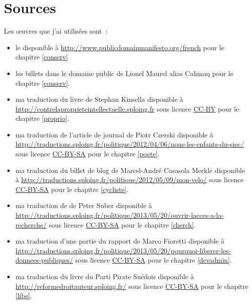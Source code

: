 \chapter*{Sources}

Les œuvres que j'ai utilisées sont~:

\begin{itemize}
\item le  disponible à \url{http://www.publicdomainmanifesto.org/french} pour le chapitre \ref{conserv}
\item les billets  dans le domaine public de Lionel Maurel alias Calimaq pour le chapitre \ref{conserv}.
\item ma traduction du livre  de Stephan Kinsella disponible à \url{http://contrelaproprieteintellectuelle.sploing.fr} sous licence \href{http://creativecommons.org/licenses/by/2.0/fr/}{CC-BY}  pour le chapitre \ref{proprio}.
\item ma traduction de l'article de journal  de Piotr Czerski disponible à \url{http://traductions.sploing.fr/politique/2012/04/06/nous-les-enfants-du-siec/} sous licence \href{http://creativecommons.org/licenses/by-sa/2.0/fr/}{CC-BY-SA} pour le chapitre \ref{poete}.
\item ma traduction du billet de blog  de Marcel-André Casasola Merkle disponible à \url{http://traductions.sploing.fr/politique/2012/05/09/mon-velo/} sous licence \href{http://creativecommons.org/licenses/by-sa/2.0/fr/}{CC-BY-SA} pour le chapitre \ref{cycliste}.
\item ma traduction de  de Peter Suber disponible à \url{http://traductions.sploing.fr/politique/2013/05/20/ouvrir-lacces-a-la-recherche/} sous licence \href{http://creativecommons.org/licenses/by-sa/2.0/fr/}{CC-BY-SA} pour le chapitre \ref{cherch}.
\item ma traduction d'une partie du rapport  de Marco Fioretti disponible à \url{http://traductions.sploing.fr/politique/2013/05/20/pourquoi-liberer-les-donnees-publiques/} sous licence \href{http://creativecommons.org/licenses/by-sa/2.0/fr/}{CC-BY-SA} pour le chapitre \ref{devadmin}.
\item ma traduction du livre du Parti Pirate Suédois  disponible à \url{http://reformedroitauteur.sploing.fr/} sous licence \href{http://creativecommons.org/licenses/by-sa/2.0/fr/}{CC-BY-SA} pour le chapitre \ref{libe}. 
\end{itemize}

